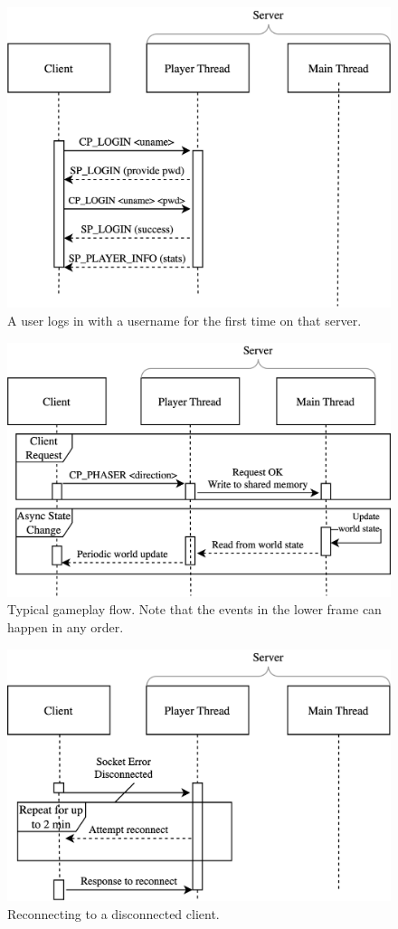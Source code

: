 \begin{figure}[h]
  \includegraphics[width=\columnwidth]{figures/nt-login}
  \caption{A user logs in with a username for the first time on that server.}
  \Description[]{}
\end{figure}
\begin{figure}[h]
  \includegraphics[width=\columnwidth]{figures/nt-typical}
  \caption{Typical gameplay flow. Note that the events in the lower frame can happen in any order.}
  \Description[]{}
\end{figure}
\begin{figure}[h!]
  \includegraphics[width=\columnwidth]{figures/nt-recon}
  \caption{Reconnecting to a disconnected client.}
  \Description[]{}
\end{figure}
